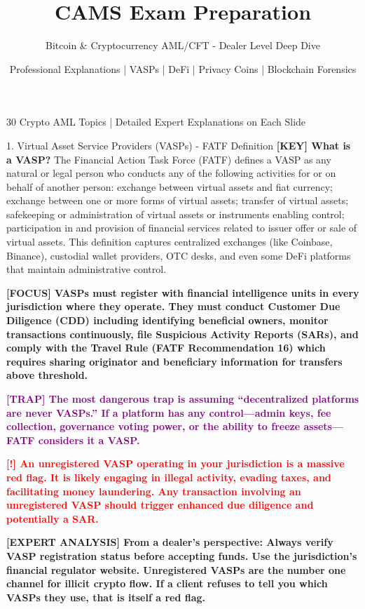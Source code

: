 \documentclass[11pt,a4paper]{beamer}
\title[CAMS Crypto AML]{CAMS Exam Preparation}
\subtitle{Bitcoin \& Cryptocurrency AML/CFT - Dealer Level Deep Dive}
\author{Professional Explanations | VASPs | DeFi | Privacy Coins | Blockchain Forensics}
\date{}
\newcommand{\redflag}[1]{\textcolor{red}{\textbf{[!] #1}}}
\newcommand{\examfocus}[1]{\textcolor{orange!80!black}{\textbf{[FOCUS] #1}}}
\newcommand{\trap}[1]{\textcolor{purple}{\textbf{[TRAP] #1}}}
\newcommand{\keyterm}[1]{\textcolor{red!80!black}{\textbf{[KEY] #1}}}
\newcommand{\expert}[1]{\textcolor{blue!70!black}{\textbf{[EXPERT ANALYSIS] #1}}}
\begin{document}
	
	\begin{frame}
		\titlepage
		\centering
		\tiny 30 Crypto AML Topics | Detailed Expert Explanations on Each Slide
	\end{frame}
	
	\begin{frame}{1. Virtual Asset Service Providers (VASPs) - FATF Definition}
		\tiny
		\keyterm{What is a VASP?} The Financial Action Task Force (FATF) defines a VASP as any natural or legal person who conducts any of the following activities for or on behalf of another person: exchange between virtual assets and fiat currency; exchange between one or more forms of virtual assets; transfer of virtual assets; safekeeping or administration of virtual assets or instruments enabling control; participation in and provision of financial services related to issuer offer or sale of virtual assets. This definition captures centralized exchanges (like Coinbase, Binance), custodial wallet providers, OTC desks, and even some DeFi platforms that maintain administrative control.
		
		\vspace{0.1cm}
		\examfocus{VASPs must register with financial intelligence units in every jurisdiction where they operate. They must conduct Customer Due Diligence (CDD) including identifying beneficial owners, monitor transactions continuously, file Suspicious Activity Reports (SARs), and comply with the Travel Rule (FATF Recommendation 16) which requires sharing originator and beneficiary information for transfers above threshold.}
		
		\vspace{0.1cm}
		\trap{The most dangerous trap is assuming “decentralized platforms are never VASPs.” If a platform has any control—admin keys, fee collection, governance voting power, or the ability to freeze assets—FATF considers it a VASP.}
		
		\vspace{0.1cm}
		\redflag{An unregistered VASP operating in your jurisdiction is a massive red flag. It is likely engaging in illegal activity, evading taxes, and facilitating money laundering. Any transaction involving an unregistered VASP should trigger enhanced due diligence and potentially a SAR.}
		
		\vspace{0.1cm}
		\expert{From a dealer's perspective: Always verify VASP registration status before accepting funds. Use the jurisdiction's financial regulator website. Unregistered VASPs are the number one channel for illicit crypto flow. If a client refuses to tell you which VASPs they use, that is itself a red flag.}
	\end{frame}
	
\end{document}

